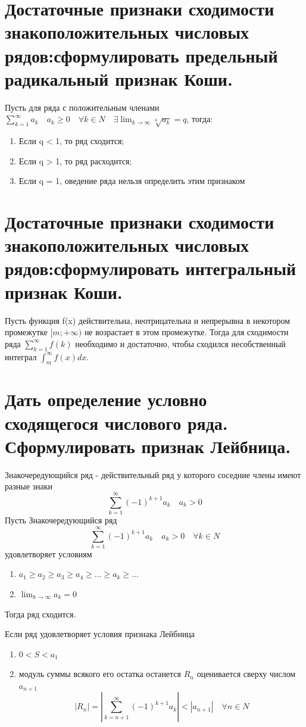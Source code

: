 \documentclass{article}
\begin{document}
\section{Достаточные признаки сходимости знакоположительных числовых рядов:сформулировать предельный радикальный признак Коши.}
Пусть для ряда с положительным членами  $\sum_{k=1}^{\infty} a_k \quad a_k  \geq 0 \quad \forall k \in N \quad \exists \lim_{k \to \infty} \sqrt[k]{a_k}  = q $, тогда:
\begin{enumerate}
\item Если q < 1, то ряд сходится;
\item Если q > 1, то ряд расходится;
\item Если q = 1, оведение ряда нельзя определить этим признаком
\end{enumerate}
\section{Достаточные признаки сходимости знакоположительных числовых рядов:сформулировать интегральный признак Коши.}
Пусть функция f(x) действительна, неотрицательна и непрерывна в некотором промежутке $[m; +\infty )$ не возрастает в этом промежутке. Тогда для сходимости ряда $\sum_{k=1}^{\infty} f(k)$ необходимо и достаточно, чтобы сходился несобственный интеграл $\int_{m}^{\infty}f(x)dx$.
\section{Дать определение условно сходящегося числового ряда. Сформулировать признак Лейбница.}
Знакочередующийся ряд  - действительный ряд у которого соседние члены имеют разные знаки
\begin{equation}
\sum_{k=1}^{\infty}(-1)^{k+1} a_k \quad a_k > 0
\end{equation}
Пусть Знакочередующийся ряд
\begin{equation}
\sum_{k=1}^{\infty}(-1)^{k+1} a_k \quad a_k > 0  \quad \forall k \in N
\end{equation}
удовлетворяет условиям
\begin{enumerate}
\item $a_1 \geq a_2 \geq a_3 \geq a_4 \geq \text{...} \geq a_k \geq \text{...}$
\item  $\lim_{k \to \infty} a_k = 0$
\end{enumerate}
Тогда ряд сходится.

Если ряд удовлетворяет условия признака Лейбница
\begin{enumerate}
\item $0 < S < a_1$
\item модуль суммы всякого его остатка останется $R_n$ оценивается сверху числом $a_{n+1}$
  \begin{equation}
    |R_n| = | \sum_{k=n+1}^{\infty} (-1)^{k+1} a_k | < |a_{n+1}| \quad \forall n \in N
  \end{equation}
\end{enumerate}
\end{document}

